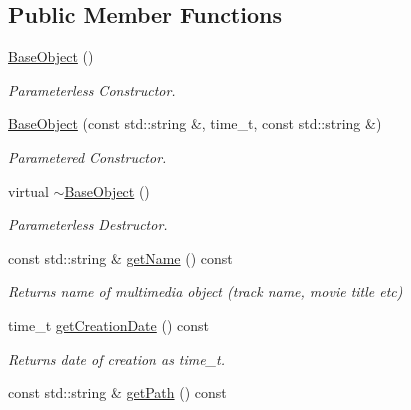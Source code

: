 \subsection*{Public Member Functions}
\begin{DoxyCompactItemize}
\item 
\hypertarget{classBaseObject_ac9e64a371856dc974183c1b04bfdd0c9}{\hyperlink{classBaseObject_ac9e64a371856dc974183c1b04bfdd0c9}{Base\-Object} ()}\label{classBaseObject_ac9e64a371856dc974183c1b04bfdd0c9}

\begin{DoxyCompactList}\small\item\em Parameterless Constructor. \end{DoxyCompactList}\item 
\hypertarget{classBaseObject_a17f97975dac448e2b3ce74f2a91ef58d}{\hyperlink{classBaseObject_a17f97975dac448e2b3ce74f2a91ef58d}{Base\-Object} (const std\-::string \&, time\-\_\-t, const std\-::string \&)}\label{classBaseObject_a17f97975dac448e2b3ce74f2a91ef58d}

\begin{DoxyCompactList}\small\item\em Parametered Constructor. \end{DoxyCompactList}\item 
virtual \hyperlink{classBaseObject_a83eecfd3bdaffda4e6c7d0fb98747f96}{$\sim$\-Base\-Object} ()
\begin{DoxyCompactList}\small\item\em Parameterless Destructor. \end{DoxyCompactList}\item 
\hypertarget{classBaseObject_a3fb1249b695ba6e93d943a4c42a97b76}{const std\-::string \& \hyperlink{classBaseObject_a3fb1249b695ba6e93d943a4c42a97b76}{get\-Name} () const }\label{classBaseObject_a3fb1249b695ba6e93d943a4c42a97b76}

\begin{DoxyCompactList}\small\item\em Returns name of multimedia object (track name, movie title etc) \end{DoxyCompactList}\item 
\hypertarget{classBaseObject_a1d9abdd27cea258333a27d505c57e857}{time\-\_\-t \hyperlink{classBaseObject_a1d9abdd27cea258333a27d505c57e857}{get\-Creation\-Date} () const }\label{classBaseObject_a1d9abdd27cea258333a27d505c57e857}

\begin{DoxyCompactList}\small\item\em Returns date of creation as time\-\_\-t. \end{DoxyCompactList}\item 
\hypertarget{classBaseObject_a308eb98d8d6dd266c8d4be254754b092}{const std\-::string \& \hyperlink{classBaseObject_a308eb98d8d6dd266c8d4be254754b092}{get\-Path} () const }\label{classBaseObject_a308eb98d8d6dd266c8d4be254754b092}


\end{DoxyCompactItemize}
